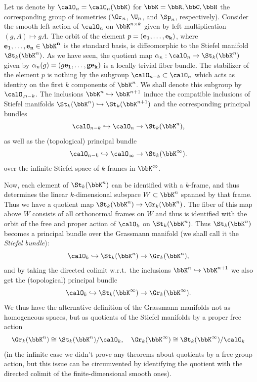 Let us denote by $\calO_n=\calO_n(\bbK)$ for $\bbK=\bbR,\bbC,\bbH$ the corresponding group of isometries ($\Or_n$, $\U_n$, and $\Sp_n$, respectively). Consider the smooth left action of $\calO_n$ on $\bbK^{n\times k}$ given by left multiplication $(g,A)\mapsto gA$. The orbit of the element $p=(\bf{e}_1,\ldots,\bf{e}_k)$, where $\bf{e}_1,\ldots,\bf{e}_n\in\bbK^n$ is the standard basis, is diffeomorphic to the Stiefel manifold $\St_k(\bbK^n)$. As we have seen, the quotient map $\alpha_n:\calO_n\to \St_k(\bbK^n)$ given by $\alpha_n(g)=(g\bf{e}_1,\ldots,g\bf{e}_k)$ is a locally trivial fiber bundle. The stabilizer of the element $p$ is nothing by the subgroup $\calO_{n-k}\subset \calO_n$ which acts as identity on the first $k$ components of $\bbK^n$. We shall denote this subgroup by $\calO_{,n-k}$. The inclusions $\bbK^n\hookrightarrow \bbK^{n+1}$ induce the compatible inclusions  of Stiefel manifolds $\St_k(\bbK^n)\hookrightarrow \St_k(\bbK^{n+1})$ and the corresponding principal bundles
\[\calO_{n-k}\hookrightarrow \calO_n\to \St_k(\bbK^n),\]
as well as the (topological) principal bundle
\[\calO_{n-k}\hookrightarrow \calO_\infty\to \St_k(\bbK^\infty).\]
over the infinite Stiefel space of $k$-frames in $\bbK^\infty$.

Now, each element of $\St_k(\bbK^n)$ can be identified with a $k$-frame, and thus determines the linear $k$-dimensional subspace $W\subset \bbK^n$ spanned by that frame. Thus we have a quotient map $\St_k(\bbK^n)\to \Gr_k(\bbK^n)$. The fiber of this map above $W$ consists of all orthonormal frames on $W$ and thus is identified with the orbit of the free and proper action of $\calO_k$ on $\St_k(\bbK^n)$. Thus $\St_k(\bbK^n)$ becomes a principal bundle over the Grassmann manifold (we shall call it the \emph{Stiefel bundle}):
\[\calO_k\hookrightarrow \St_k(\bbK^n)\to \Gr_k(\bbK^n),\label{eq Stiefel pfb}\]
and by taking the directed colimit w.r.t.\ the inclusions $\bbK^n\hookrightarrow \bbK^{n+1}$ we also get the (topological) principal bundle
\[\calO_k\hookrightarrow \St_k(\bbK^\infty)\to \Gr_k(\bbK^\infty).\]
We thus have the alternative definition of the Grassmann manifolds not as homogeneous spaces, but as quotients of the Stiefel manifolds by a proper free action
\[\Gr_k(\bbK^n)\cong \St_k(\bbK^n)\slash \calO_k, \quad \Gr_k(\bbK^\infty)\cong \St_k(\bbK^\infty)\slash \calO_k\]
(in the infinite case we didn't prove any theorems about quotients by a free group action, but this issue can be circumvented by identifying the quotient with the directed colimit of the finite-dimensional smooth ones).

